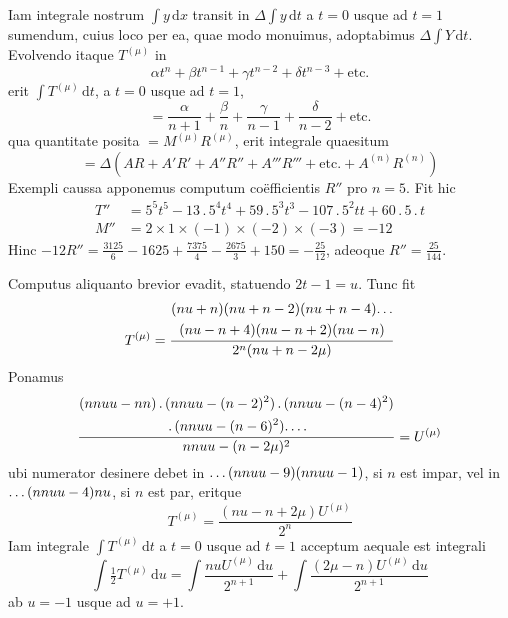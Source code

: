 Iam integrale nostrum $\int y\,\mathrm{d}x$ transit in $\Delta\int y\,\mathrm{d}t$ a $t=0$ usque ad $t=1$ sumendum, cuius loco per ea, quae modo monuimus, adoptabimus $\Delta\int Y\,\mathrm{d}t$. Evolvendo itaque $T^{(\mu)}$ in
\[
\alpha t^n+\beta t^{n-1}+\gamma t^{n-2}+\delta t^{n-3}+\text{etc.}
\]
erit $\int T^{(\mu)}\,\mathrm{d}t$, a $t=0$ usque ad $t=1$,
\[
=\frac{\alpha}{n+1}+\frac{\beta}{n}+\frac{\gamma}{n-1}+\frac{\delta}{n-2}+\text{etc.}
\]
qua quantitate posita $=M^{(\mu)}R^{(\mu)}$, erit integrale quaesitum
\[
=\Delta(AR+A'R'+A''R''+A'''R'''+\text{etc.}+A^{(n)}R^{(n)})
\]
Exempli caussa apponemus computum co\"efficientis $R''$ pro $n=5$. Fit hic
\[
\begin{aligned}
T''&=5^5t^5-13\, .\,5^4t^4+59\, .\,5^3t^3-107\, .\,5^2tt+60\, .\,5\, .\,t\\[5pt]
M''&=2\times1\times(-1)\times(-2)\times(-3)=-12
\end{aligned}
\]
Hinc $-12R''=\allowbreak \frac{3125}{6}-1625+\allowbreak \frac{7375}{4}-\frac{2675}{3}+\allowbreak 150=\allowbreak -\frac{25}{12}$, adeoque $R''=\frac{25}{144}$.

Computus aliquanto brevior evadit, statuendo $2t-1=u$. Tunc fit
\[
T^{(\mu)}=\frac{\begin{gathered}(nu+n)(nu+n-2)(nu+n-4)\ldotp\ldotp\ldotp\\(nu-n+4)(nu-n+2)(nu-n)\end{gathered}}{2^n(nu+n-2\mu)}
\]
Ponamus
\[
\frac{\begin{gathered}(nnuu-nn)\, .\,(nnuu-(n-2)^2)\, .\,(nnuu-(n-4)^2)\\\, .\,(nnuu-(n-6)^2)\ldotp\ldotp\ldotp\ldotp\end{gathered}}{nnuu-(n-2\mu)^2}=U^{(\mu)}
\]
ubi numerator desinere debet in $\ldotp\ldotp\ldotp(nnuu-9)(nnuu-1)$, si $n$ est impar, vel in $\ldotp\ldotp\ldotp(nnuu-4)nu$, si $n$ est par, eritque
\[
T^{(\mu)}=\frac{(nu-n+2\mu)U^{(\mu)}}{2^n}
\]
Iam integrale $\int T^{(\mu)}\,\mathrm{d}t$ a $t=0$ usque ad $t=1$ acceptum aequale est integrali
\[
\int\tfrac12 T^{(\mu)}\,\mathrm{d}u=\int\frac{nuU^{(\mu)}\,\mathrm{d}u}{2^{n+1}}+\int\frac{(2\mu-n)U^{(\mu)}\,\mathrm{d}u}{2^{n+1}}
\]
ab $u=-1$ usque ad $u=+1$.

